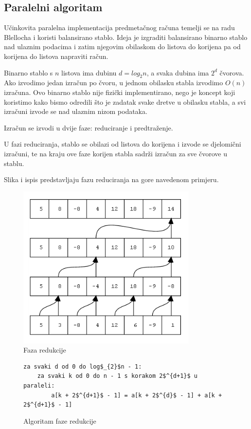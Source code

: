 \documentclass[times, utf8, zavrsni, numeric]{fer}
\begin{document}
\subsection{Paralelni algoritam}
\indent

Učinkovita paralelna implementacija predmetačnog računa temelji se na radu Blellocha \cite{blelloch} i koristi balansirano stablo. Ideja je izgraditi balansirano binarno stablo nad ulaznim podacima i zatim njegovim obilaskom do listova do korijena pa od korijena do listova napraviti račun.

Binarno stablo s $n$ listova ima dubinu $d = log_{2}n$, a svaka dubina ima $2^{d}$ čvorova. Ako izvodimo jedan izračun po čvoru, u jednom obilasku stabla izvodimo $O(n)$ izračuna. Ovo binarno stablo nije fizički implementirano, nego je koncept koji koristimo kako bismo odredili što je zadatak svake dretve u obilasku stabla, a svi izračuni izvode se nad ulaznim nizom podataka.

Izračun se izvodi u dvije faze: reduciranje i predtraženje.

U fazi reduciranja, stablo se obilazi od listova do korijena i izvode se djelomični izračuni, te na kraju ove faze korijen stabla sadrži izračun za sve čvorove u stablu.

Slika i ispis predstavljaju fazu reduciranja na gore navedenom primjeru.

\begin{figure}[ht!]
\centering
\includegraphics[width=90mm]{redukcija.png}
\caption{Faza redukcije}
\label{redukcija}
\end{figure}

\begin{figure}[hbt]
\begin{singlespace}
\begin{lstlisting}[label={reduciranje}]
za svaki d od 0 do log$_{2}$n - 1:
	za svaki k od 0 do n - 1 s korakom 2$^{d+1}$ u paraleli:
		a[k + 2$^{d+1}$ - 1] = a[k + 2$^{d}$ - 1] + a[k + 2$^{d+1}$ - 1]
\end{lstlisting}
\end{singlespace}
\caption{Algoritam faze redukcije}
\label{redukcijaalgoritam}
\end{figure}
\end{document}
